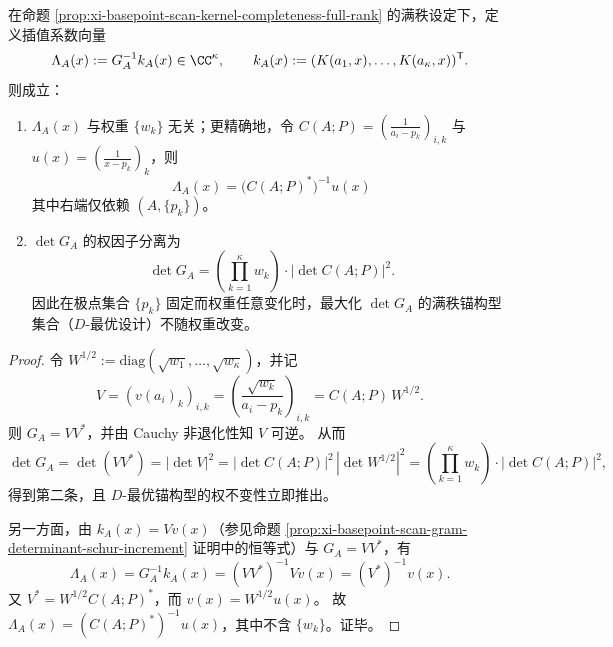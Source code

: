 %

\begin{proposition}\label{prop:xi-basepoint-scan-full-rank-weight-gauge-invariance}
在命题 \ref{prop:xi-basepoint-scan-kernel-completeness-full-rank} 的满秩设定下，定义插值系数向量
\[
\Lambda_A(x):=G_A^{-1}k_A(x)\in\CC^\kappa,
\qquad
k_A(x):=(K(a_1,x),\dots,K(a_\kappa,x))^{\mathsf T}.
\]
则成立：
\begin{enumerate}
  \item \(\Lambda_A(x)\) 与权重 \(\{w_k\}\) 无关；更精确地，令 \(C(A;P)=(\frac{1}{a_i-p_k})_{i,k}\) 与 \(u(x)=(\frac{1}{x-p_k})_{k}\)，则
  \[
  \boxed{\;\Lambda_A(x)=\bigl(C(A;P)^\ast\bigr)^{-1}u(x)\;}
  \]
  其中右端仅依赖 \((A,\{p_k\})\)。
  \item \(\det G_A\) 的权因子分离为
  \[
  \boxed{\;\det G_A=\left(\prod_{k=1}^{\kappa}w_k\right)\cdot \left|\det C(A;P)\right|^2.\;}
  \]
  因此在极点集合 \(\{p_k\}\) 固定而权重任意变化时，最大化 \(\det G_A\) 的满秩锚构型集合（\(D\)-最优设计）不随权重改变。
\end{enumerate}
\end{proposition}
\begin{proof}
令 \(W^{1/2}:=\mathrm{diag}(\sqrt{w_1},\dots,\sqrt{w_\kappa})\)，并记
\[
V=(v(a_i)_k)_{i,k}=\left(\frac{\sqrt{w_k}}{a_i-p_k}\right)_{i,k}=C(A;P)\,W^{1/2}.
\]
则 \(G_A=VV^\ast\)，并由 Cauchy 非退化性知 \(V\) 可逆。
从而
\[
\det G_A=\det(VV^\ast)=|\det V|^2
=|\det C(A;P)|^2\,|\det W^{1/2}|^2
=\left(\prod_{k=1}^{\kappa}w_k\right)\cdot|\det C(A;P)|^2,
\]
得到第二条，且 \(D\)-最优锚构型的权不变性立即推出。
\par
另一方面，由 \(k_A(x)=Vv(x)\)（参见命题 \ref{prop:xi-basepoint-scan-gram-determinant-schur-increment} 证明中的恒等式）与 \(G_A=VV^\ast\)，有
\[
\Lambda_A(x)=G_A^{-1}k_A(x)=(VV^\ast)^{-1}Vv(x)=(V^\ast)^{-1}v(x).
\]
又 \(V^\ast=W^{1/2}C(A;P)^\ast\)，而 \(v(x)=W^{1/2}u(x)\)。
故 \(\Lambda_A(x)=(C(A;P)^\ast)^{-1}u(x)\)，其中不含 \(\{w_k\}\)。证毕。
\end{proof}


